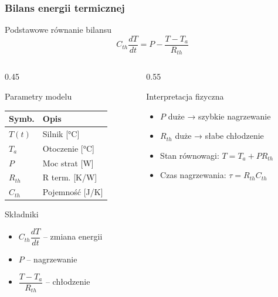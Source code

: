 \documentclass[10pt, aspectratio=169, t]{beamer}
\begin{document}
\begin{frame}
	\frametitle{Bilans energii termicznej}
	
	\begin{block}{Podstawowe równanie bilansu}
		\[
		\boxed{C_{th}\frac{dT}{dt} = P - \frac{T - T_a}{R_{th}}}
		\]
	\end{block}
	
	\vspace{-0.3cm}
	
	\begin{columns}[T]
		\begin{column}{0.45\textwidth}
			\begin{block}{Parametry modelu}
				\centering
				\tiny
				\setlength{\tabcolsep}{1pt}
				\begin{tabular}{@{}p{0.9cm}p{1.8cm}@{}}
					\hline
					\textbf{Symb.} & \textbf{Opis} \\
					\hline
					$T(t)$ & Silnik [°C] \\
					$T_a$ & Otoczenie [°C] \\
					$P$ & Moc strat [W] \\
					$R_{th}$ & R term. [K/W] \\
					$C_{th}$ & Pojemność [J/K] \\
					\hline
				\end{tabular}
			\end{block}
			
			\begin{exampleblock}{Składniki}
				\tiny
				\begin{itemize}
					\item $C_{th}\dfrac{dT}{dt}$ – zmiana energii
					\item $P$ – nagrzewanie
					\item $\dfrac{T-T_a}{R_{th}}$ – chłodzenie
				\end{itemize}
			\end{exampleblock}
		\end{column}
		
		\begin{column}{0.55\textwidth}
			\begin{alertblock}{Interpretacja fizyczna}
				\tiny
				\begin{itemize}
					\item $P$ duże → szybkie nagrzewanie
					\item $R_{th}$ duże → słabe chłodzenie
					\item Stan równowagi: $T = T_a + PR_{th}$
					\item Czas nagrzewania: $\tau = R_{th}C_{th}$
				\end{itemize}
			\end{alertblock}
			

\end{column}
\end{columns}
\end{frame}
\end{document}

